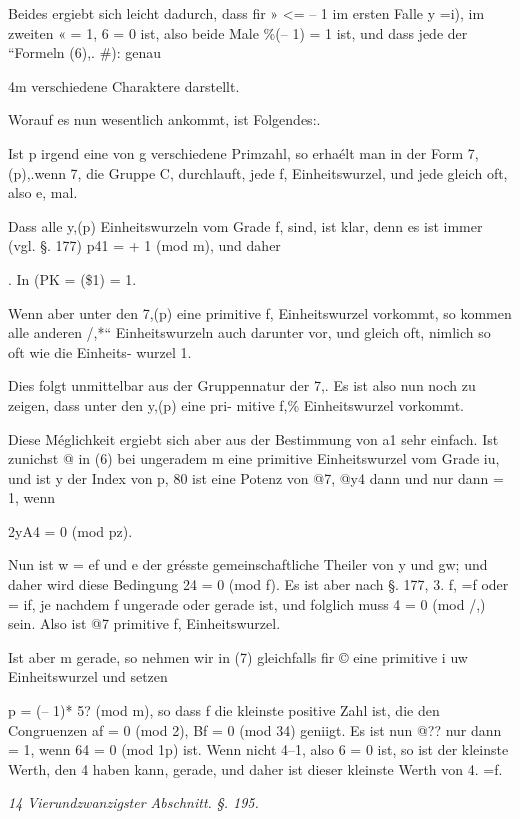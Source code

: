 \documentclass[12pt,a4paper]{article}
\theoremstyle{plain}
\theoremstyle{definition}
\begin{document}

Beides ergiebt sich leicht dadurch, dass fir » <= -- 1 im ersten Falle y =i), im zweiten « = 1, 6 = 0 ist, also beide Male \%(-- 1) = 1 ist, und dass jede der ``Formeln (6),. \#): genau

4m verschiedene Charaktere darstellt.

Worauf es nun wesentlich ankommt, ist Folgendes:.

Ist p irgend eine von g verschiedene Primzahl, so erhaélt man in der Form 7, (p),.wenn 7, die Gruppe C, durchlauft, jede f, Einheitswurzel, und jede gleich oft, also e, mal.

Dass alle y,(p) Einheitswurzeln vom Grade f, sind, ist klar, denn es ist immer (vgl. §. 177) p41 = + 1 (mod m), und daher

. In (PK = (\$1) = 1.

Wenn aber unter den 7,(p) eine primitive f, Einheitswurzel vorkommt, so kommen alle anderen /,*`` Einheitswurzeln auch darunter vor, und gleich oft, nimlich so oft wie die Einheits- wurzel 1.

Dies folgt unmittelbar aus der Gruppennatur der 7,. Es ist also nun noch zu zeigen, dass unter den y,(p) eine pri- mitive f,\% Einheitswurzel vorkommt.

Diese Méglichkeit ergiebt sich aber aus der Bestimmung von a1 sehr einfach. Ist zunichst @ in (6) bei ungeradem m eine primitive Einheitswurzel vom Grade iu, und ist y der Index von p, 80 ist eine Potenz von @7, @y4 dann und nur dann = 1, wenn

2yA4 = 0 (mod pz).

Nun ist w = ef und e der grésste gemeinschaftliche Theiler von y und gw; und daher wird diese Bedingung 24 = 0 (mod f). Es ist aber nach §. 177, 3. f, =f oder = if, je nachdem f ungerade oder gerade ist, und folglich muss 4 = 0 (mod /,) sein. Also ist @7 primitive f, Einheitswurzel.

Ist aber m gerade, so nehmen wir in (7) gleichfalls fir © eine primitive i uw Einheitswurzel und setzen

p = (-- 1)* 5? (mod m), so dass f die kleinste positive Zahl ist, die den Congruenzen af = 0 (mod 2), Bf = 0 (mod 34) geniigt. Es ist nun @?? nur dann = 1, wenn 64 = 0 (mod 1p) ist. Wenn nicht 4--1, also 6 = 0 ist, so ist der kleinste Werth, den 4 haben kann, gerade, und daher ist dieser kleinste Werth von 4. =f.

\vspace{0.5\baselineskip}\noindent\textit{14 Vierundzwanzigster Abschnitt. §. 195.}\par
\end{document}
